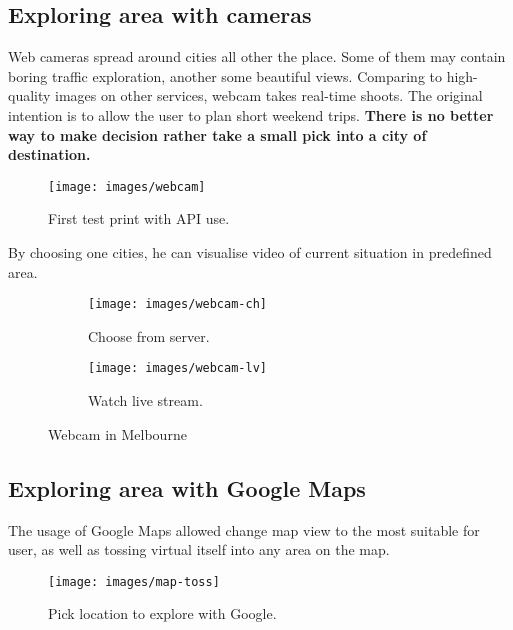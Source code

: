 \documentclass[12pt]{article}
\numberwithin{equation}{section} %
\numberwithin{figure}{section} %
\numberwithin{table}{section} %
\begin{document}
	\subsection{Exploring area with cameras}
		Web cameras spread around cities all other the place. Some of them may contain boring traffic exploration, another some beautiful views. Comparing to high-quality images on other services, webcam takes real-time shoots. The original intention is to allow the user to plan short weekend trips. \textbf{There is no better way to make decision rather take a small pick into a city of destination.}
		\begin{figure}[H]
			\centering        
			\texttt{[image: images/webcam]}
			\caption{First test print with API use.}
			\label{fig:webcam}
		\end{figure}
		By choosing one cities, he can visualise video of current situation in predefined area.
		\begin{figure}[H]
			\begin{subfigure}[b]{0.52\textwidth}
				\centering
				\texttt{[image: images/webcam-ch]}
				\caption{Choose from server.}
				
			\end{subfigure}
			\begin{subfigure}[b]{0.52\textwidth}
				\centering
				\texttt{[image: images/webcam-lv]}
				\caption{Watch live stream.}
				
			\end{subfigure}
			\caption{Webcam in Melbourne}
		\end{figure}
	
	\subsection{Exploring area with Google Maps}
		The usage of Google Maps allowed change map view to the most suitable for user, as well as tossing virtual itself into any area on the map.
		\begin{figure}[H]
			\centering        
			\texttt{[image: images/map-toss]}
			\caption{Pick location to explore with Google.}
			\label{fig:toss}
		\end{figure}
\end{document}

